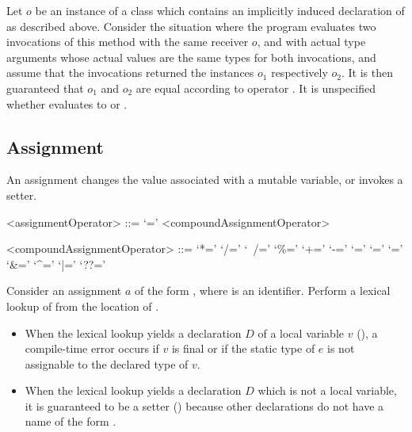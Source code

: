 \documentclass[makeidx]{article}
\begin{document}
{{\LMHash{}%
Let $o$ be an instance of a class which contains
an implicitly induced declaration of \gmiName{}
as described above.
%
Consider the situation where the program evaluates
two invocations of this method with the same receiver $o$,
and with actual type arguments whose actual values are
the same types  for both invocations,
and assume that the invocations returned
the instances $o_1$ respectively $o_2$.
%
It is then guaranteed that $o_1$ and $o_2$ are equal
according to operator \lit{==}.
It is unspecified whether
evaluates to \TRUE{} or \FALSE{}.

} %



\subsection{Assignment}

\LMHash{}%
An assignment changes the value associated with a mutable variable,
or invokes a setter.

\begin{grammar}
<assignmentOperator> ::= `='
  \alt <compoundAssignmentOperator>

<compoundAssignmentOperator> ::= `*='
  \alt `/='
  \alt `~/='
  \alt `\%='
  \alt `+='
  \alt `-='
  \alt `\ltlt='
  \alt `\gtgt='
  \alt `\gtgtgt='
  \alt `\&='
  \alt `^='
  \alt `|='
  \alt `??='
\end{grammar}

\LMHash{}%
Consider an assignment $a$ of the form ,
where \id{} is an identifier.
Perform a lexical lookup of \code{\id=} from the location of \id.

\begin{itemize}
\item
  When the lexical lookup yields a declaration $D$ of a local variable $v$
  (),
  a compile-time error occurs if $v$ is final
  or if the static type of $e$ is not assignable to the declared type of $v$.
\item
  When the lexical lookup yields a declaration $D$
  which is not a local variable,
  it is guaranteed to be a setter
  ()
  because other declarations do not have a name
  of the form \code{\id=}.


\end{itemize}}
\end{document}
